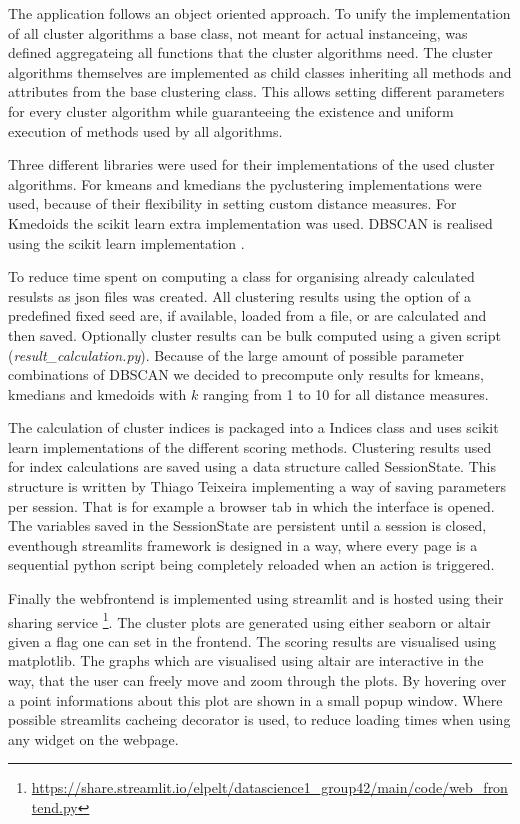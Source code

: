The application follows an object oriented approach. To unify the implementation of all cluster algorithms a base class, not meant for actual instanceing, was defined aggregateing all functions that the cluster algorithms need.
The cluster algorithms themselves are implemented as child classes inheriting all methods and attributes from the base clustering class. This allows setting different parameters for every cluster algorithm while guaranteeing the existence and uniform execution of methods used by all algorithms.

Three different libraries were used for their implementations of the used cluster algorithms. 
For kmeans and kmedians the pyclustering \cite{Novikov2019} implementations were used, because of their flexibility in setting custom distance measures. For Kmedoids the scikit learn extra \cite{scikit-learn-extra} implementation was used.
DBSCAN is realised using the scikit learn implementation \cite{scikitlearn}.

To reduce time spent on computing a class for organising already calculated resulsts as json files was created. All clustering results using the option of a predefined fixed seed are, if available, loaded from a file, or are calculated and then saved. Optionally cluster results can be bulk computed using a given script (\textit{result\_calculation.py}). Because of the large amount of possible parameter combinations of DBSCAN we decided to precompute only results for kmeans, kmedians and kmedoids with $k$ ranging from 1 to 10 for all distance measures.

The calculation of cluster indices is packaged into a Indices class and uses scikit learn implementations of the different scoring methods. Clustering results used for index calculations are saved using a data structure called SessionState. This structure is written by Thiago Teixeira \cite{sessionstate} implementing a way of saving parameters per session. That is for example a browser tab in which the interface is opened. The variables saved in the SessionState are persistent until a session is closed, eventhough streamlits framework is designed in a way, where every page is a sequential python script being completely reloaded when an action is triggered. 

Finally the webfrontend is implemented using streamlit and is hosted using their sharing service \footnote{\url{https://share.streamlit.io/elpelt/datascience1_group42/main/code/web_frontend.py}}. The cluster plots are generated using either seaborn or altair given a flag one can set in the frontend. The scoring results are visualised using matplotlib. The graphs which are visualised using altair are interactive in the way, that the user can freely move and zoom through the plots. By hovering over a point informations about this plot are shown in a small popup window. Where possible streamlits cacheing decorator is used, to reduce loading times when using any widget on the webpage.

